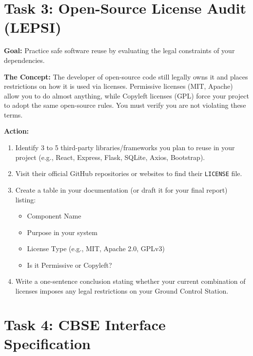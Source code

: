 \documentclass[a4paper,12pt]{article}
\begin{document}
\section*{Task 3: Open-Source License Audit (LEPSI)}

\textbf{Goal:} Practice safe software reuse by evaluating the legal constraints of your dependencies.

\textbf{The Concept:} The developer of open-source code still legally owns it and places restrictions on how it is used via licenses. Permissive licenses (MIT, Apache) allow you to do almost anything, while Copyleft licenses (GPL) force your project to adopt the same open-source rules. You must verify you are not violating these terms.



\vspace{0.3cm}
\textbf{Action:}
\begin{enumerate}
    \item Identify 3 to 5 third-party libraries/frameworks you plan to reuse in your project (e.g., React, Express, Flask, SQLite, Axios, Bootstrap).
    \item Visit their official GitHub repositories or websites to find their \texttt{LICENSE} file.
    \item Create a table in your documentation (or draft it for your final report) listing:
    \begin{itemize}
        \item Component Name
        \item Purpose in your system
        \item License Type (e.g., MIT, Apache 2.0, GPLv3)
        \item Is it Permissive or Copyleft?
    \end{itemize}
    \item Write a one-sentence conclusion stating whether your current combination of licenses imposes any legal restrictions on your Ground Control Station.
\end{enumerate}


\section*{Task 4: CBSE Interface Specification}
\end{document}

